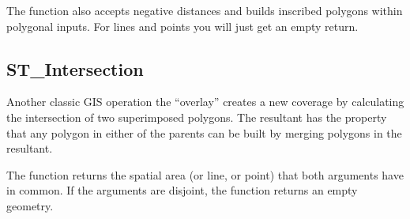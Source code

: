 \documentclass[a4paper,11pt,english]{sphinxmanual}
\begin{document}
\begin{sphinxVerbatim}[commandchars=\\\{\}]
   
   
 
   
\end{sphinxVerbatim}

\noindent{}

The  function also accepts negative distances and builds inscribed polygons within polygonal inputs. For lines and points you will just get an empty return.

\noindent{}


\subsection{ST\_Intersection}
\label{\detokenize{basic:st-intersection}}
Another classic GIS operation \textendash{} the “overlay” \textendash{} creates a new coverage by calculating the intersection of two superimposed polygons. The resultant has the property that any polygon in either of the parents can be built by merging polygons in the resultant.

The  function returns the spatial area (or line, or point) that both arguments have in common. If the arguments are disjoint, the function returns an empty geometry.

\begin{sphinxVerbatim}[commandchars=\\\{\}]

 
   
   
\end{sphinxVerbatim}
\end{document}
